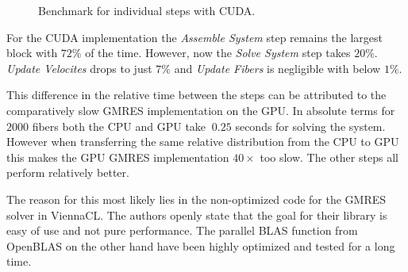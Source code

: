 \documentclass[a4paper,11pt]{kth-mag}
\begin{document}
\begin{figure}[!htbp]
  \centering
  \caption{Benchmark for individual steps with CUDA.}
  \label{fig:bench_cuda_steps}
\end{figure}

For the CUDA implementation the \emph{Assemble System} step remains the largest block with $72\%$ of the time. However, now the \emph{Solve System} step takes $20\%$. \emph{Update Velocites} drops to just $7\%$ and \emph{Update Fibers} is negligible with below $1\%$.

This difference in the relative time between the steps can be attributed to the comparatively slow GMRES implementation on the GPU. In absolute terms for $2000$ fibers both the CPU and GPU take $~0.25$ seconds for solving the system. However when transferring the same relative distribution from the CPU to GPU this makes the GPU GMRES implementation $40×$ too slow. The other steps all perform relatively better.

The reason for this most likely lies in the non-optimized code for the GMRES solver in ViennaCL. The authors openly state that the goal for their library is easy of use and not pure performance. The parallel BLAS function from OpenBLAS on the other hand have been highly optimized and tested for a long time.
\end{document}
